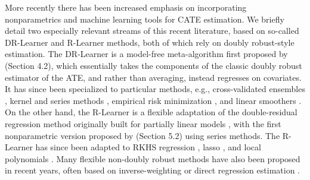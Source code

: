 \documentclass[11pt,twoside]{article}
\theoremstyle{definition}
\theoremstyle{remark}
\begin{document}
More recently there has been increased emphasis on incorporating nonparametrics and machine learning tools for CATE estimation. We  briefly detail two especially relevant streams of this recent literature, based on so-called DR-Learner and R-Learner methods, both of which rely on doubly robust-style estimation. The DR-Learner is a model-free meta-algorithm first proposed by \citet{van2006statistical} (Section 4.2), which essentially takes the components of the classic doubly robust estimator of the ATE, and rather than averaging, instead regresses on covariates. It has since been specialized to particular methods, e.g., cross-validated ensembles \citep{luedtke2016super}, kernel \citep{lee2017doubly, fan2019estimation, zimmert2019nonparametric} and series methods \citep{semenova2017estimation}, empirical risk minimization \citep{foster2019orthogonal}, and linear smoothers \citep{kennedy2023towards}.  On the other hand, the R-Learner is a flexible adaptation of the double-residual regression method originally built for partially linear models \citep{robinson1988root}, with the first nonparametric version proposed by \citet{robins2008higher} (Section 5.2) using series methods. The R-Learner has since  been adapted to RKHS regression \citep{nie2017quasi}, lasso \citep{zhao2017selective, chernozhukov2017orthogonal}, and local polynomials \citep{kennedy2023towards}.  Many flexible non-doubly robust methods have also been proposed in recent years, often based on inverse-weighting or direct regression estimation \citep{foster2011subgroup, imai2013estimating, athey2016recursive, shalit2017estimating, wager2018estimation, kunzel2019metalearners, hahn2020bayesian}. \\
\end{document}
